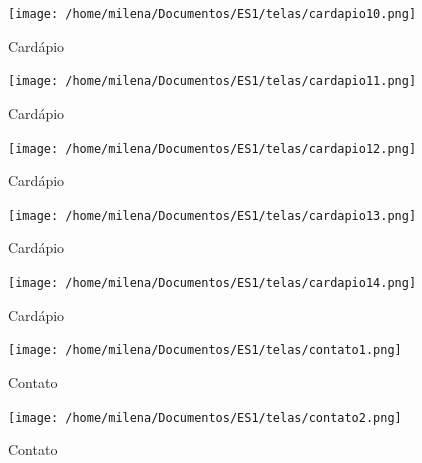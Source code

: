\documentclass[12pt, a4paper]{article}
\begin{document}
\begin{figure}[htb]
	\caption{Cardápio}
	
	\centering %
	\texttt{[image: /home/milena/Documentos/ES1/telas/cardapio10.png]} %
	
\end{figure}

\begin{figure}[htb]
	\caption{Cardápio}
	
	\centering %
	\texttt{[image: /home/milena/Documentos/ES1/telas/cardapio11.png]} %
	
\end{figure}

\begin{figure}[htb]
	\caption{Cardápio}
	
	\centering %
	\texttt{[image: /home/milena/Documentos/ES1/telas/cardapio12.png]} %
	
\end{figure}

\begin{figure}[htb]
	\caption{Cardápio}
	
	\centering %
	\texttt{[image: /home/milena/Documentos/ES1/telas/cardapio13.png]} %
	
\end{figure}

\begin{figure}[htb]
	\caption{Cardápio}
	
	\centering %
	\texttt{[image: /home/milena/Documentos/ES1/telas/cardapio14.png]} %
	
\end{figure}

\begin{figure}[htb]
	\caption{Contato}
	
	\centering %
	\texttt{[image: /home/milena/Documentos/ES1/telas/contato1.png]} %
	
\end{figure}

\begin{figure}[htb]
	\caption{Contato}
	
	\centering %
	\texttt{[image: /home/milena/Documentos/ES1/telas/contato2.png]} %
	
\end{figure}
\end{document}
